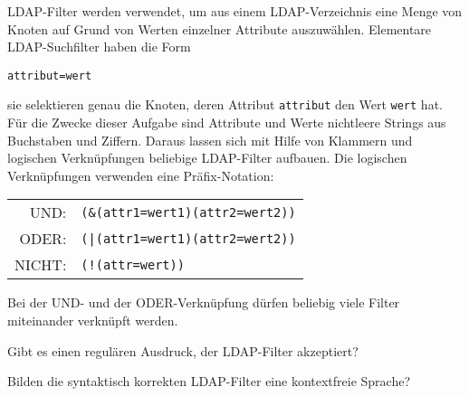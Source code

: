 LDAP-Filter werden verwendet, um aus einem LDAP-Verzeichnis eine Menge
von Knoten auf Grund von Werten einzelner Attribute auszuwählen.
Elementare LDAP-Suchfilter haben die Form
\begin{verbatim}
attribut=wert
\end{verbatim}
sie selektieren genau die Knoten, deren Attribut {\tt attribut}
den Wert {\tt wert} hat.
Für die Zwecke dieser Aufgabe sind Attribute und Werte nichtleere
Strings aus Buchstaben und Ziffern. 
Daraus lassen sich
mit Hilfe von Klammern und logischen Verknüpfungen
beliebige LDAP-Filter aufbauen.
Die logischen Verknüpfungen verwenden eine Präfix-Notation: 
\begin{center}
\begin{tabular}{rl}
UND:&\tt (\&(attr1=wert1)(attr2=wert2))\\
ODER:&\tt (|(attr1=wert1)(attr2=wert2))\\
NICHT:&\tt (!(attr=wert))
\end{tabular}
\end{center}
Bei der UND- und der ODER-Verknüpfung dürfen beliebig viele 
Filter miteinander verknüpft werden.
\begin{teilaufgaben}
\item
Gibt es einen regulären Ausdruck, der LDAP-Filter akzeptiert?
\item
Bilden die syntaktisch korrekten LDAP-Filter eine kontextfreie Sprache?
\end{teilaufgaben}



